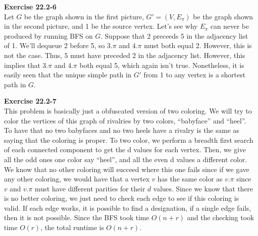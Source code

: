 \documentclass{article}
\begin{document}
\noindent\textbf{Exercise 22.2-6}\\

Let $G$ be the graph shown in the first picture, $G' = (V, E_\pi)$ be the graph shown in the second picture, and 1 be the source vertex.  Let's see why $E_\pi$ can never be produced by running BFS on $G$.  Suppose that 2 preceeds 5 in the adjacency list of 1.  We'll dequeue 2 before 5, so $3.\pi$ and $4.\pi$ must both equal 2.  However, this is not the case.  Thus, 5 must have preceded 2 in the adjacency list.  However, this implies that $3.\pi$ and $4.\pi$ both equal 5, which again isn't true. Nonetheless, it is easily seen that the unique simple path in $G'$ from 1 to any vertex is a shortest path in $G$. \\



\noindent\textbf{Exercise 22.2-7}\\

This problem is basically just a obfuscated version of two coloring. We will try to color the vertices of this graph of rivalries by two colors, ``babyface'' and ``heel''. To have that no two babyfaces and no two heels have a rivalry is the same as saying that the coloring is proper. To two color, we perform a breadth first search of each connected component to get the d values for each vertex. Then, we give all the odd ones one color say ``heel'', and all the even d values a different color. We know that no other coloring will succeed where this one fails since if we gave any other coloring, we would have that a vertex $v$ has the same color as $v.\pi$ since $v$ and $v.\pi$ must have different parities for their $d$ values. Since we know that there is no better coloring, we just need to check each edge to see if this coloring is valid. If each edge works, it is possible to find a designation, if a single edge fails, then it is not possible. Since the BFS took time $O(n+r)$ and the checking took time $O(r)$, the total runtime is $O(n+r)$.\\
\end{document}

